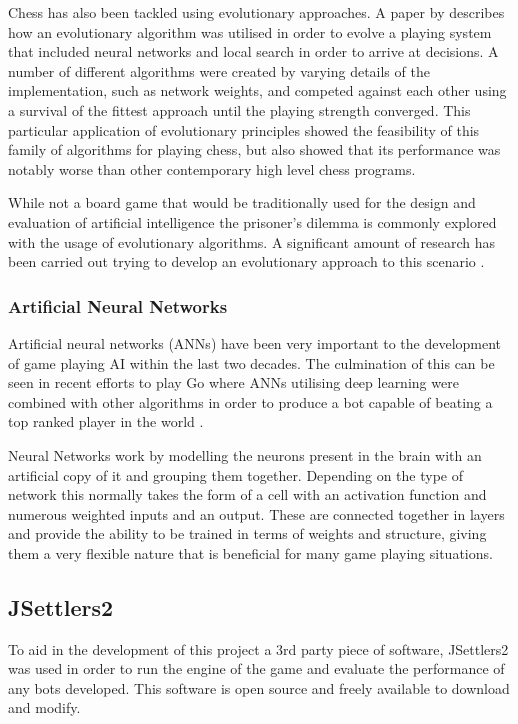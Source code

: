 \documentclass[]{article}
\begin{document}
\par Chess has also been tackled using evolutionary approaches. A paper by \textcite{fogel2004self} describes how an evolutionary algorithm was utilised in order to evolve a playing system that included neural networks and local search in order to arrive at decisions. A number of different algorithms were created by varying details of the implementation, such as network weights, and competed against each other using a survival of the fittest approach until the playing strength converged. This particular application of evolutionary principles showed the feasibility of this family of algorithms for playing chess, but also showed that its performance was notably worse than other contemporary high level chess programs.

\par While not a board game that would be traditionally used for the design and evaluation of artificial intelligence the prisoner's dilemma is commonly explored with the usage of evolutionary algorithms. A significant amount of research has been carried out trying to develop an evolutionary approach to this scenario \autocite{axelrod1987evolution, kendall2007iterated}. 

\subsubsection{Artificial Neural Networks}

Artificial neural networks (ANNs) have been very important to the development of game playing AI within the last two decades. The culmination of this can be seen in recent efforts to play Go where ANNs utilising deep learning were combined with other algorithms in order to produce a bot capable of beating a top ranked player in the world \autocite{chang2016google}.

Neural Networks work by modelling the neurons present in the brain with an artificial copy of it and grouping them together. Depending on the type of network this normally takes the form of a cell with an activation function and numerous weighted inputs and an output. These are connected together in layers and provide the ability to be trained in terms of weights and structure, giving them a very flexible nature that is beneficial for many game playing situations.  

\subsection{JSettlers2}
To aid in the development of this project a 3rd party piece of software, JSettlers2 \autocite{moninJsettlers} was used in order to run the engine of the game and evaluate the performance of any bots developed. This software is open source and freely available to download and modify.
\end{document}
